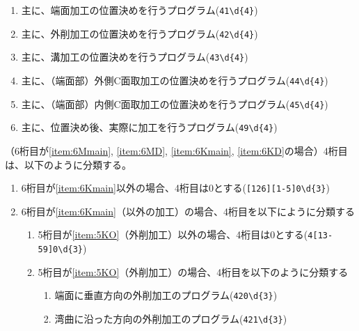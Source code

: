 \begin{enumerate}[label=\alph*)]
  \begin{enumerate}[label=\arabic*., ref=\arabic*, start=1]
  \item\label{item:5KF} 主に、端面加工の位置決めを行うプログラム(\verb|41\d{4}|)
  \item\label{item:5KO} 主に、外削加工の位置決めを行うプログラム(\verb|42\d{4}|)
  \item\label{item:5KK} 主に、溝加工の位置決めを行うプログラム(\verb|43\d{4}|)
  \item\label{item:5KCO} 主に、（端面部）外側C面取加工の位置決めを行うプログラム(\verb|44\d{4}|)
  \item\label{item:5KCI} 主に、（端面部）内側C面取加工の位置決めを行うプログラム(\verb|45\d{4}|)
  \setcounter{enumii}{8}
  \item 主に、位置決め後、実際に加工を行うプログラム(\verb|49\d{4}|)
  \end{enumerate}
\end{enumerate}


（6桁目が\ref{item:6Mmain}, \ref{item:6MD}, \ref{item:6Kmain}, \ref{item:6KD}の場合）4桁目は、以下のように分類する。
\begin{enumerate}[label=\alph*), ref=\alph*)]
\item 6桁目が\ref{item:6Kmain}\hx 以外の場合、4桁目は0とする(\verb|[126][1-5]0\d{3}|)
\item 6桁目が\ref{item:6Kmain}（\dimple 以外の加工）の場合、4桁目を以下にように分類する
  \begin{enumerate}[label=\alph{enumi}\,-\arabic*), leftmargin=\leftmargini]
  \item 5桁目が\ref{item:5KO}（外削加工）以外の場合、4桁目は0とする(\verb|4[13-59]0\d{3}|)
  \item 5桁目が\ref{item:5KO}（外削加工）の場合、4桁目を以下のように分類する
    \begin{enumerate}[label=\arabic*., ref=\arabic*, start=0, leftmargin=*]
    \item 端面に垂直方向の外削加工のプログラム(\verb|420\d{3}|)
    \item 湾曲に沿った方向の外削加工のプログラム(\verb|421\d{3}|)
    \end{enumerate}
  \end{enumerate}
\end{enumerate}




